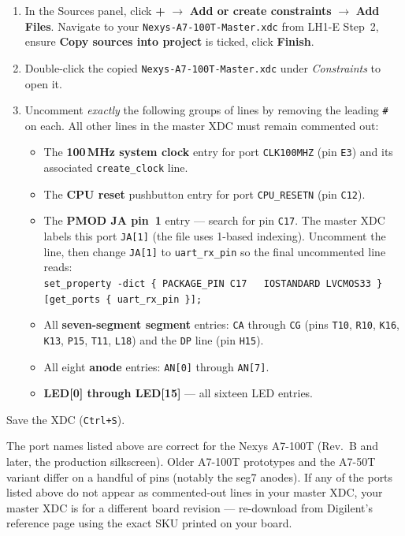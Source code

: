 \documentclass[11pt,letterpaper]{article}
\begin{document}
\begin{enumerate}[leftmargin=2em]
	\item In the Sources panel, click \textbf{+} $\to$ \textbf{Add or create constraints} $\to$ \textbf{Add Files}. Navigate to your \texttt{Nexys-A7-100T-Master.xdc} from LH1-E Step~2, ensure \textbf{Copy sources into project} is ticked, click \textbf{Finish}.
	\item Double-click the copied \texttt{Nexys-A7-100T-Master.xdc} under \textit{Constraints} to open it.
	\item Uncomment \emph{exactly} the following groups of lines by removing the leading \texttt{\#} on each. All other lines in the master XDC must remain commented out:
	\begin{itemize}[leftmargin=1.2em, topsep=2pt, itemsep=2pt]
		\item The \textbf{100\,MHz system clock} entry for port \texttt{CLK100MHZ} (pin \texttt{E3}) and its associated \texttt{create\_clock} line.
		\item The \textbf{CPU reset} pushbutton entry for port \texttt{CPU\_RESETN} (pin \texttt{C12}).
		\item The \textbf{PMOD JA pin~1} entry --- search for pin \texttt{C17}. The master XDC labels this port \texttt{JA[1]} (the file uses 1-based indexing). Uncomment the line, then change \texttt{JA[1]} to \texttt{uart\_rx\_pin} so the final uncommented line reads:\\
		\texttt{set\_property -dict \{ PACKAGE\_PIN C17~~ IOSTANDARD LVCMOS33 \} [get\_ports \{ uart\_rx\_pin \}];}
		\item All \textbf{seven-segment segment} entries: \texttt{CA} through \texttt{CG} (pins \texttt{T10}, \texttt{R10}, \texttt{K16}, \texttt{K13}, \texttt{P15}, \texttt{T11}, \texttt{L18}) and the \texttt{DP} line (pin \texttt{H15}).
		\item All eight \textbf{anode} entries: \texttt{AN[0]} through \texttt{AN[7]}.
		\item \textbf{LED[0] through LED[15]} --- all sixteen LED entries.
	\end{itemize}
\end{enumerate}

Save the XDC (\texttt{Ctrl+S}).

\begin{tcolorbox}[warning={Pin numbers are board-revision specific}]
	The port names listed above are correct for the Nexys A7-100T (Rev.~B and later, the production silkscreen). Older A7-100T prototypes and the A7-50T variant differ on a handful of pins (notably the seg7 anodes). If any of the ports listed above do not appear as commented-out lines in your master XDC, your master XDC is for a different board revision --- re-download from Digilent's reference page using the exact SKU printed on your board.
\end{tcolorbox}
\end{document}
